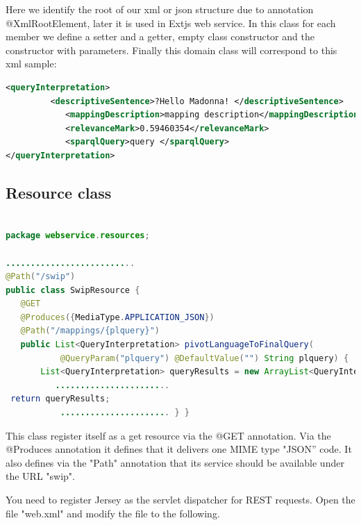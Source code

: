 \par Here we identify the root of our xml or json structure due to annotation @XmlRootElement, later it is used in Extjs web service. In this class for each member we define a setter and a getter, empty class constructor and the constructor with parameters.
Finally this domain class will correspond to this xml sample: \\
\begin{lstlisting}[language=XML]
<queryInterpretation>
         <descriptiveSentence>?Hello Madonna! </descriptiveSentence>
            <mappingDescription>mapping description</mappingDescription>
            <relevanceMark>0.59460354</relevanceMark>
            <sparqlQuery>query </sparqlQuery>
</queryInterpretation>
\end{lstlisting}

\subsection{Resource class}

\begin{lstlisting}[language=Java]

package webservice.resources;

..........................
@Path("/swip")
public class SwipResource {
   @GET
   @Produces({MediaType.APPLICATION_JSON})
   @Path("/mappings/{plquery}")
   public List<QueryInterpretation> pivotLanguageToFinalQuery(
           @QueryParam("plquery") @DefaultValue("") String plquery) {
       List<QueryInterpretation> queryResults = new ArrayList<QueryInterpretation>();
          .......................       
 return queryResults;
           ...................... } }
\end{lstlisting}
  
\par This class register itself as a get resource via the @GET annotation. Via the @Produces annotation it defines that it delivers one MIME type "JSON” code. It also defines via the "Path" annotation that its service should be available under the URL "swip".

\par You need to register Jersey as the servlet dispatcher for REST requests. Open the file "web.xml" and modify the file to the following. \\ 

